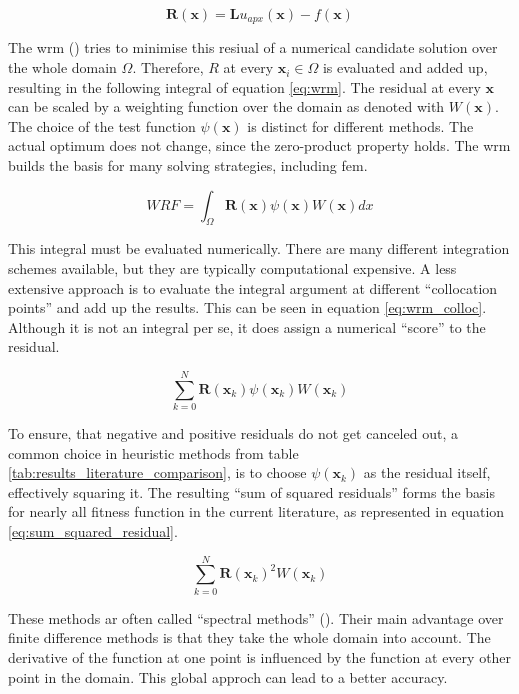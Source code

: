 \documentclass[./\jobname.tex]{subfiles}
\begin{document}
\begin{equation}
\label{eq:residual}
\mathbf{R}(\mathbf{x}) = \mathbf{L}u_{apx}(\mathbf{x}) - f(\mathbf{x})
\end{equation}

The \gls{wrm} (\cite{shen_spectral_2011}) tries to minimise this resiual of a numerical candidate solution over the whole domain $\Omega$. Therefore, $R$ at every $\mathbf{x}_i \in \Omega$ is evaluated and added up, resulting in the following integral of equation \ref{eq:wrm}. The residual at every $\mathbf{x}$ can be scaled by a weighting function over the domain as denoted with $W(\mathbf{x})$. The choice of the test function $\psi(\mathbf{x})$ is distinct for different methods. The actual optimum does not change, since the zero-product property holds. The \gls{wrm} builds the basis for many solving strategies, including \gls{fem}. 

\begin{equation}
\label{eq:wrm}
WRF = \int_{\Omega} \mathbf{R}(\mathbf{x}) \psi(\mathbf{x}) W(\mathbf{x}) dx
\end{equation}

This integral must be evaluated numerically. There are many different integration schemes available, but they are typically computational expensive. A less extensive approach is to evaluate the integral argument at different ``collocation points'' and add up the results. This can be seen in equation \ref{eq:wrm_colloc}. Although it is not an integral per se, it does assign a numerical ``score'' to the residual. 

\begin{equation}
\label{eq:wrm_colloc}
\sum_{k=0}^{N} \mathbf{R}(\mathbf{x}_k) \psi(\mathbf{x}_k) W(\mathbf{x}_k)
\end{equation}

To ensure, that negative and positive residuals do not get canceled out, a common choice in heuristic methods from table \ref{tab:results_literature_comparison}, is to choose $\psi(\mathbf{x}_k)$ as the residual itself, effectively squaring it. The resulting ``sum of squared residuals'' forms the basis for nearly all fitness function in the current literature, as represented in equation \ref{eq:sum_squared_residual}.

\begin{equation}
\label{eq:sum_squared_residual}
\sum_{k=0}^{N} \mathbf{R}(\mathbf{x}_k)^2 W(\mathbf{x}_k)
\end{equation}

These methods ar often called ``spectral methods'' (\cite{shen_spectral_2011}). Their main advantage over finite difference methods is that they take the whole domain into account. The derivative of the function at one point is influenced by the function at every other point in the domain. This global approch can lead to a better accuracy. 
\end{document}
